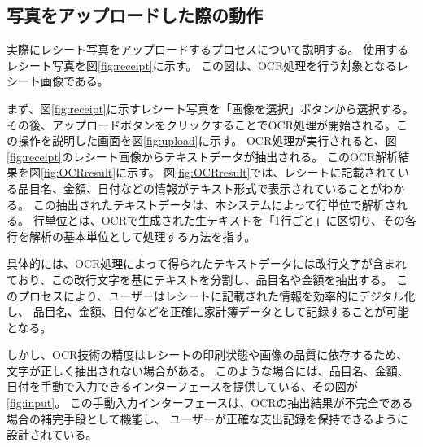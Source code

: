 \documentclass[main]{subfiles}
\begin{document}

\subsection{写真をアップロードした際の動作}

実際にレシート写真をアップロードするプロセスについて説明する。
使用するレシート写真を図\ref{fig:receipt}に示す。
この図は、OCR処理を行う対象となるレシート画像である。

まず、図\ref{fig:receipt}に示すレシート写真を「画像を選択」ボタンから選択する。
その後、アップロードボタンをクリックすることでOCR処理が開始される。この操作を説明した画面を図\ref{fig:upload}に示す。
OCR処理が実行されると、図\ref{fig:receipt}のレシート画像からテキストデータが抽出される。
このOCR解析結果を図\ref{fig:OCRresult}に示す。
図\ref{fig:OCRresult}では、レシートに記載されている品目名、金額、日付などの情報がテキスト形式で表示されていることがわかる。
この抽出されたテキストデータは、本システムによって行単位で解析される。
行単位とは、OCRで生成された生テキストを「1行ごと」に区切り、その各行を解析の基本単位として処理する方法を指す。

具体的には、OCR処理によって得られたテキストデータには改行文字が含まれており、この改行文字を基にテキストを分割し、品目名や金額を抽出する。
このプロセスにより、ユーザーはレシートに記載された情報を効率的にデジタル化し、
品目名、金額、日付などを正確に家計簿データとして記録することが可能となる。

しかし、OCR技術の精度はレシートの印刷状態や画像の品質に依存するため、文字が正しく抽出されない場合がある。
このような場合には、品目名、金額、日付を手動で入力できるインターフェースを提供している、その図が\ref{fig:input}。
この手動入力インターフェースは、OCRの抽出結果が不完全である場合の補完手段として機能し、
ユーザーが正確な支出記録を保持できるように設計されている。
\end{document}
